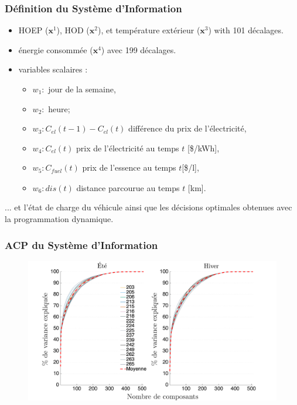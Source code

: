 \documentclass[french]{beamer}
\providecommand{\ve}[1]{{\pmb{#1}}} %
\begin{document}
{\begin{frame}
\frametitle{Définition du Système d'Information} 
\begin{itemize}
\item HOEP ($\ve{x}^1$), HOD ($\ve{x}^2$), et température extérieur ($\ve{x}^3$) with 101 décalages.
\item énergie consommée ($\ve{x}^4$) avec 199 décalages.
\item variables scalaires : 
\begin{itemize}
\item $w_1:$ jour de la semaine,
\item $w_2:$ heure;
\item $w_3: C_\mathit{el}(t-1)-C_\mathit{el}(t)$ différence du prix de l'électricité,
\item $w_4: C_\mathit{el}(t)$ prix de l'électricité au temps $t$ [\$/kWh],
\item $w_5: C_\mathit{fuel}(t)$ prix de l’essence au temps $t$[\$/l],
\item $w_6: dis(t)$ distance parcourue au temps $t$ [km].
\end{itemize}
\end{itemize}

\pause
... et l'état de charge du véhicule ainsi que les décisions optimales obtenues avec la programmation dynamique.

\end{frame}

\begin{frame}
\frametitle{ACP du Système d'Information} 
\begin{figure}
\begin{center}
\includegraphics[width=\textwidth]{figPCAvarExplainedFr2.png}
\end{center}
\end{figure}
\end{frame}


}
\end{document}
